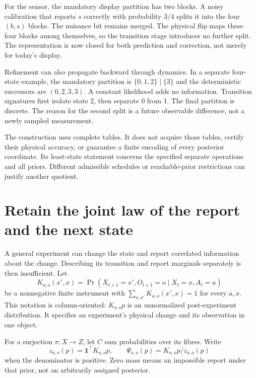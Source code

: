 For the sensor, the mandatory display partition has two blocks. A noisy calibration that reports $s$ correctly with probability $3/4$ splits it into the four $(b,s)$ blocks. The nuisance bit remains merged. The physical flip maps these four blocks among themselves, so the transition stage introduces no further split. The representation is now closed for both prediction and correction, not merely for today's display.

Refinement can also propagate backward through dynamics. In a separate four-state example, the mandatory partition is $\{0,1,2\}\mid\{3\}$ and the deterministic successors are $(0,2,3,3)$. A constant likelihood adds no information. Transition signatures first isolate state 2, then separate 0 from 1. The final partition is discrete. The reason for the second split is a future observable difference, not a newly sampled measurement.

The construction uses complete tables. It does not acquire those tables, certify their physical accuracy, or guarantee a finite encoding of every posterior coordinate. Its least-state statement concerns the specified separate operations and all priors. Different admissible schedules or reachable-prior restrictions can justify another quotient.

\section{Retain the joint law of the report and the next state}
A general experiment can change the state and report correlated information about the change. Describing its transition and report marginals separately is then insufficient. Let
\[
 K_{a,o}(x',x)=\Pr(X_{t+1}=x',O_{t+1}=o\mid X_t=x,A_t=a)
\]
be a nonnegative finite instrument with $\sum_{o,x'}K_{a,o}(x',x)=1$ for every $a,x$. This notation is column-oriented: $K_{a,o}p$ is an unnormalized post-experiment distribution. It specifies an experiment's physical change and its observation in one object.

For a surjection $\pi:X\to Z$, let $C$ sum probabilities over its fibres. Write
\[
 z_{a,o}(p)=\mathbf1^\top K_{a,o}p,\qquad
 \Psi_{a,o}(p)=K_{a,o}p/z_{a,o}(p)
\]
when the denominator is positive. Zero mass means an impossible report under that prior, not an arbitrarily assigned posterior.

